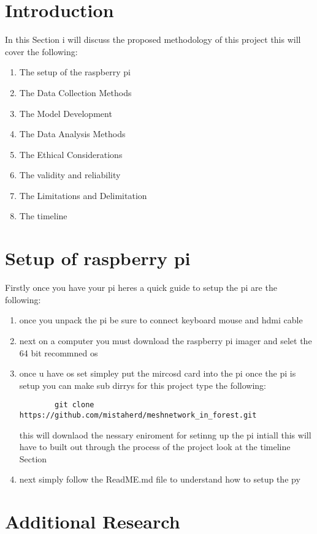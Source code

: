 
\section{Introduction}
In this  Section  i will discuss the  proposed  methodology of this  project this will cover the  following:
\begin{enumerate}
    \item The setup of the raspberry pi
    \item The Data Collection Methods
    \item The Model Development
    \item The Data Analysis Methods
    \item The Ethical Considerations
    \item The validity and reliability 
    \item The Limitations and Delimitation
    \item The timeline
\end{enumerate} 
\section{Setup of raspberry pi}
Firstly once you have  your pi  heres  a  quick  guide to setup the pi are  the following:
\begin{enumerate}
    \item once you unpack the  pi be sure  to  connect keyboard mouse  and hdmi cable
    \item next on a computer you must download the  raspberry pi imager and  selet the  64 bit  recommned os 
    \item once u have os set simpley put the  mircosd card  into  the pi once the  pi is  setup you can make sub dirrys for this project type the  following:
    \begin{verbatim}
        git clone https://github.com/mistaherd/meshnetwork_in_forest.git
    \end{verbatim}
    this  will downlaod the  nessary  eniroment for  setinng up the  pi  intiall this will have to built out  through the  process of  the   project look at the timeline Section
    \item next simply follow the ReadME.md file  to  understand  how  to setup the py
\end{enumerate}


\section{Additional  Research}

